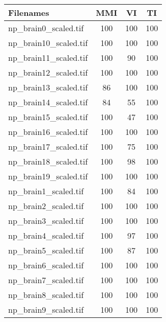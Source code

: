 \begin{tabular}{lccc}
\hline
 Filenames             & MMI & VI  & TI  \\ \hline \hline
 np\_brain0\_scaled.tif  & 100 & 100 & 100 \\
 np\_brain10\_scaled.tif & 100 & 100 & 100 \\
 np\_brain11\_scaled.tif & 100 & 90  & 100 \\
 np\_brain12\_scaled.tif & 100 & 100 & 100 \\
 np\_brain13\_scaled.tif & 86  & 100 & 100 \\
 np\_brain14\_scaled.tif & 84  & 55  & 100 \\
 np\_brain15\_scaled.tif & 100 & 47  & 100 \\
 np\_brain16\_scaled.tif & 100 & 100 & 100 \\
 np\_brain17\_scaled.tif & 100 & 75  & 100 \\
 np\_brain18\_scaled.tif & 100 & 98  & 100 \\
 np\_brain19\_scaled.tif & 100 & 100 & 100 \\
 np\_brain1\_scaled.tif  & 100 & 84  & 100 \\
 np\_brain2\_scaled.tif  & 100 & 100 & 100 \\
 np\_brain3\_scaled.tif  & 100 & 100 & 100 \\
 np\_brain4\_scaled.tif  & 100 & 97  & 100 \\
 np\_brain5\_scaled.tif  & 100 & 87  & 100 \\
 np\_brain6\_scaled.tif  & 100 & 100 & 100 \\
 np\_brain7\_scaled.tif  & 100 & 100 & 100 \\
 np\_brain8\_scaled.tif  & 100 & 100 & 100 \\
 np\_brain9\_scaled.tif  & 100 & 100 & 100 \\
\hline
\end{tabular}